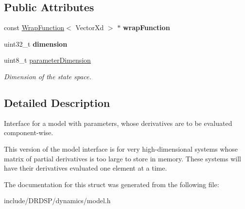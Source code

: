 \subsection*{Public Attributes}
\begin{DoxyCompactItemize}
\item 
\hypertarget{struct_d_r_d_s_p_1_1_model_parameterized_c_w_a185304f801d2372b66f5f08f4458a684}{const \hyperlink{struct_d_r_d_s_p_1_1_wrap_function}{Wrap\-Function}$<$ Vector\-Xd $>$ $\ast$ {\bfseries wrap\-Function}}\label{struct_d_r_d_s_p_1_1_model_parameterized_c_w_a185304f801d2372b66f5f08f4458a684}

\item 
\hypertarget{struct_d_r_d_s_p_1_1_model_parameterized_c_w_ac840c2c4704f71998043ea2c27fa6b8b}{uint32\-\_\-t {\bfseries dimension}}\label{struct_d_r_d_s_p_1_1_model_parameterized_c_w_ac840c2c4704f71998043ea2c27fa6b8b}

\item 
\hypertarget{struct_d_r_d_s_p_1_1_model_parameterized_c_w_a618fb5f5113e0a04bec9cd2221f30b00}{uint8\-\_\-t \hyperlink{struct_d_r_d_s_p_1_1_model_parameterized_c_w_a618fb5f5113e0a04bec9cd2221f30b00}{parameter\-Dimension}}\label{struct_d_r_d_s_p_1_1_model_parameterized_c_w_a618fb5f5113e0a04bec9cd2221f30b00}

\begin{DoxyCompactList}\small\item\em Dimension of the state space. \end{DoxyCompactList}\end{DoxyCompactItemize}


\subsection{Detailed Description}
Interface for a model with parameters, whose derivatives are to be evaluated component-\/wise. 

This version of the model interface is for very high-\/dimensional systems whose matrix of partial derivatives is too large to store in memory. These systems will have their derivatives evaluated one element at a time. 

The documentation for this struct was generated from the following file\-:\begin{DoxyCompactItemize}
\item 
include/\-D\-R\-D\-S\-P/dynamics/model.\-h\end{DoxyCompactItemize}
